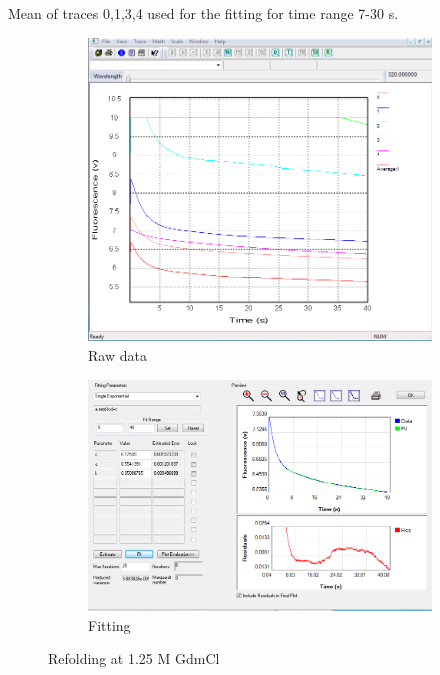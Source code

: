 \documentclass[a4paper,english,12pt,bibliography=totoc]{scrreprt}
\begin{document}
Mean of traces 0,1,3,4 used for the fitting for time range 7-30 s.
\begin{figure}[H]
    \centering
    \begin{subfigure}[b]{0.45\textwidth}
        \centering
        \includegraphics[width=\textwidth]{Images/G8/rf4_raw.PNG}
        \caption{Raw data }
        \label{fig:sub1}
    \end{subfigure}
    \hspace{0cm} %
    \begin{subfigure}[b]{0.45\textwidth}
        \centering
        \includegraphics[width=\textwidth]{Images/G8/rf4_fitting.PNG}
        \caption{Fitting}
        \label{fig:sub2}
    \end{subfigure}
    \caption{Refolding at  1.25 M GdmCl }
    \label{fig:main}
\end{figure}
\end{document}

